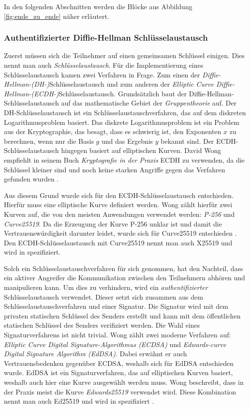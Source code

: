 \noindent In den folgenden Abschnitten werden die Blöcke aus Abbildung \ref{fig:ende_zu_ende} näher erläutert.

\subsubsection{Authentifizierter Diffie-Hellman Schlüsselaustausch}
\label{subsec:ecdh}

Zuerst müssen sich die Teilnehmer auf einen gemeinsamen Schlüssel einigen. Dies nennt man auch \textit{Schlüsselaustausch}. Für die Implementierung eines Schlüsselaustausch kamen zwei Verfahren in Frage. Zum einen der \textit{Diffie-Hellman-(DH-)}Schlüsselaustausch und zum anderen der \textit{Elliptic Curve Diffie-Hellman-(ECDH-)}Schlüsselaustausch. Grundsätzlich baut der Diffie-Hellman-Schlüsselaustausch auf das mathematische Gebiet der \textit{Gruppentheorie} auf. Der DH-Schlüsselaustausch ist ein Schlüsselaustauschverfahren, das auf dem diskreten Logarithmusproblem basiert. Das diskrete Logarithmusproblem ist ein Problem aus der Kryptographie, das besagt, dass es schwierig ist, den Exponenten $x$ zu berechnen, wenn nur die Basis $g$ und das Ergebnis $y$ bekannt sind. Der ECDH-Schlüsselaustausch hingegen basiert auf elliptischen Kurven. David Wong empfiehlt in seinem Buch \textit{Kryptografie in der Praxis} ECDH zu verwenden, da die Schlüssel kleiner sind und noch keine starken Angriffe gegen das Verfahren gefunden wurden \Parencite[S. 101-125]{Wong_KryptoPraxis}.

Aus diesem Grund wurde sich für den ECDH-Schlüsselaustausch entschieden. Hierfür muss eine elliptische Kurve definiert werden. Wong zählt hierfür zwei Kurven auf, die von den meisten Anwendungen verwendet werden: \textit{P-256} und \textit{Curve25519}. Da die Erzeugung der Kurve P-256 unklar ist und damit die Vertrauenswürdigkeit darunter leidet, wurde sich für Curve25519 entschieden \Parencite[S. 121]{Wong_KryptoPraxis}. Den ECDH-Schlüsselaustausch mit Curve25519 nennt man auch X25519 und wird in \cite{rfc_ietf_curve25519} spezifiziert.

Solch ein Schlüsselaustauschverfahren für sich genommen, hat den Nachteil, dass ein aktiver Angreifer die Kommunikation zwischen den Teilnehmern abhören und manipulieren kann. Um dies zu verhindern, wird ein \textit{authentifizierter} Schlüsselaustausch verwendet. Dieser setzt sich zusammen aus dem Schlüsselaustauschverfahren und einer Signatur. Die Signatur wird mit dem privaten statischen Schlüssel des Senders erstellt und kann mit dem öffentlichen statischen Schlüssel des Senders verifiziert werden. Die Wahl eines Signaturverfahrens ist nicht trivial. Wong zählt zwei moderne Verfahren auf: \textit{Elliptic Curve Digital Signature-Algorithmus (ECDSA)} und \textit{Edwards-curve Digital Signature Algorithm (EdDSA)}. Dabei erwähnt er auch Vertrauensbedenken gegenüber ECDSA, weshalb sich für EdDSA entschieden wurde. EdDSA ist ein Signaturverfahren, das auf elliptischen Kurven basiert, weshalb auch hier eine Kurve ausgewählt werden muss. Wong beschreibt, dass in der Praxis meist die Kurve \textit{Edwards25519} verwendet wird. Diese Kombination nennt man auch Ed25519 und wird in \cite{rfc_EdDSA} spezifiziert \Parencite[S. 160-172]{Wong_KryptoPraxis}.

